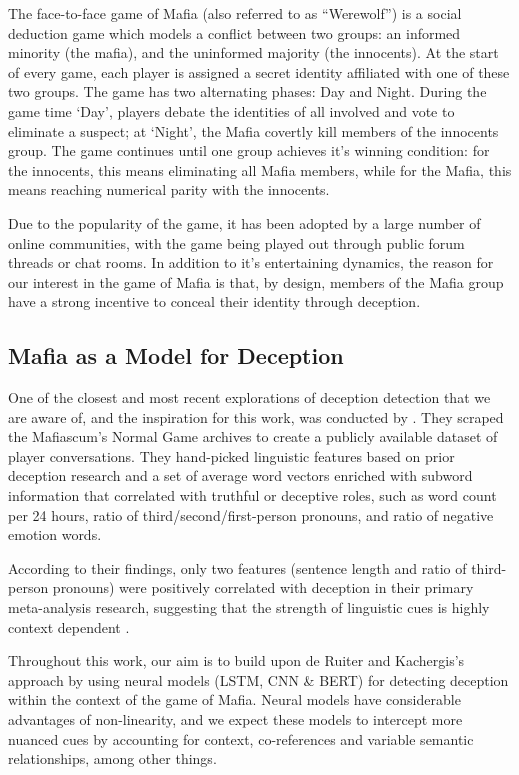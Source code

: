 \documentclass[11pt,a4paper]{article}
\begin{document}
The face-to-face game of Mafia (also referred to as ``Werewolf'') is a social deduction game which models a conflict between two groups: an informed minority (the mafia), and the uninformed majority (the innocents). At the start of every game, each player is assigned a secret identity affiliated with one of these two groups. The game has two alternating phases: Day and Night. During the game time `Day', players debate the identities of all involved and vote to eliminate a suspect; at `Night', the Mafia covertly kill members of the innocents group. The game continues until one group achieves it's winning condition: for the innocents, this means eliminating all Mafia members, while for the Mafia, this means reaching numerical parity with the innocents.

Due to the popularity of the game, it has been adopted by a large number of online communities, with the game being played out through public forum threads or chat rooms. In addition to it's entertaining dynamics, the reason for our interest in the game of Mafia is that, by design, members of the Mafia group have a strong incentive to conceal their identity through deception.

\subsection{Mafia as a Model for Deception}

One of the closest and most recent explorations of deception detection that we are aware of, and the inspiration for this work, was conducted by \citet{Ruiter}. They scraped the Mafiascum's Normal Game archives to create a publicly available dataset of player conversations. They hand-picked linguistic features based on prior deception research and a set of average word vectors enriched with subword information that correlated with truthful or deceptive roles, such as word count per 24 hours, ratio of third/second/first-person pronouns, and ratio of negative emotion words.

According to their findings, only two features (sentence length and ratio of third-person pronouns) were positively correlated with deception in their primary meta-analysis research, suggesting that the strength of linguistic cues is highly context dependent \cite{ZhouSung}.

Throughout this work, our aim is to build upon de Ruiter and Kachergis's approach by using neural models (LSTM, CNN \& BERT) for detecting deception within the context of the game of Mafia. Neural models have considerable advantages of non-linearity, and we expect these models to intercept more nuanced cues by accounting for context, co-references and variable semantic relationships, among other things.
\end{document}
